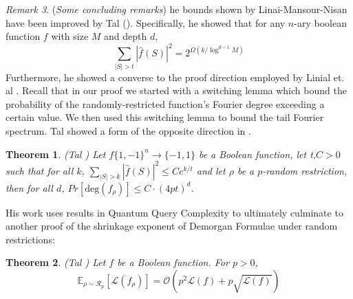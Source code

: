 \documentclass{amsart}
\newtheorem{theorem}{Theorem}[section]
\theoremstyle{definition}
\theoremstyle{remark}
\newtheorem{remark}[theorem]{Remark}
\numberwithin{equation}{section}
\theoremstyle{remark}
\begin{document}
\begin{remark}{(\emph{Some concluding remarks})}
  he bounds shown by Linai-Mansour-Nisan have been improved by Tal (\cite{tal}). Specifically, he showed that for any $n$-ary boolean function $f$ with size $M$ and depth $d$,\
  \begin{equation}
    \sum_{|S| > t} |\hat{f}(S)|^2 = 2^{\Omega(k/\log^{d-1}{M})}
  \end{equation}
  Furthermore, he showed a converse to the proof direction employed by Linial et. al \cite{lmn}. Recall that in our proof we started with a switching lemma which bound the probability of the randomly-restricted function's Fourier degree exceeding a certain value. We then used this switching lemma to bound the tail Fourier spectrum. Tal showed a form of the opposite direction in \cite{talshrinkage}.
  \begin{theorem}{\emph{(Tal \cite{talshrinkage})}}
    Let $f\{1,-1\}^n \rightarrow \{-1,1\}$ be a Boolean function, let t,$C > 0$ such that for all $k$, $\sum_{|S| > k} |\hat{f}(S)|^2 \leq C e^{k/t}$ and let $\rho$ be a $p$-random restriction, then for all $d$, $Pr[\text{deg}(f_{\rho})] \leq C \cdot (4pt)^d$.
  \end{theorem}
  His work uses results in Quantum Query Complexity to ultimately culminate to another proof of the shrinkage exponent of Demorgan Formulae under random restrictions:
  \begin{theorem}{\emph{(Tal \cite{talshrinkage})}}
    Let $f$ be a Boolean function. For $p > 0$,
    \begin{equation}
      \mathbb{E}_{\rho \sim \mathcal{R}_p}[\mathcal{L}(f_\rho)] = \mathcal{O} \left(p^2\mathcal{L}(f) + p\sqrt{\mathcal{L}(f)} \right)
    \end{equation}
  \end{theorem}
\end{remark}


\end{document}
